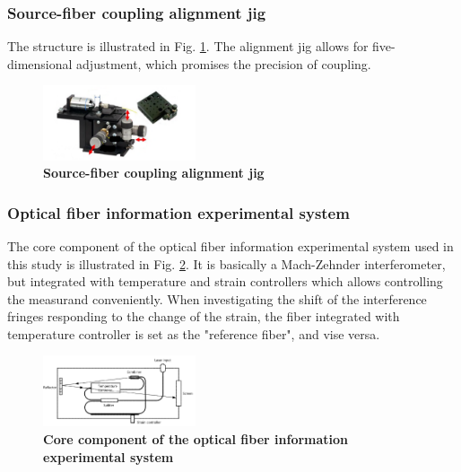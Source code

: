 \documentclass[10pt,a4paper,twocolumn,twoside,UTF8]{article}
\begin{document}
	\subsubsection{Source-fiber coupling alignment jig}
	The structure is illustrated in Fig. \ref{fig.illus-5.1}. The alignment jig allows for five-dimensional adjustment, which promises the precision of coupling.
	\begin{figure}[htbp]
		\centering
		\includegraphics[width=0.4\textwidth]{attachments/illus-5.1.png}
		\caption{\textbf{Source-fiber coupling alignment jig}}
		\label{fig.illus-5.1}
	\end{figure}

	\subsubsection{Optical fiber information experimental system}
	The core component of the optical fiber information experimental system used in this study is illustrated in Fig. \ref{fig.illus-6.1}. 
	It is basically a Mach-Zehnder interferometer, but integrated with temperature and strain controllers which allows controlling the measurand conveniently. 
	When investigating the shift of the interference fringes responding to the change of the strain, the fiber integrated with temperature controller is set as the "reference fiber", and vise versa.
	\begin{figure}[htbp]
		\centering
		\includegraphics[width=0.4\textwidth]{attachments/illus-6.1.png}
		\caption{\textbf{Core component of the optical fiber information experimental system}}
		\label{fig.illus-6.1}
	\end{figure}
	
\end{document}
